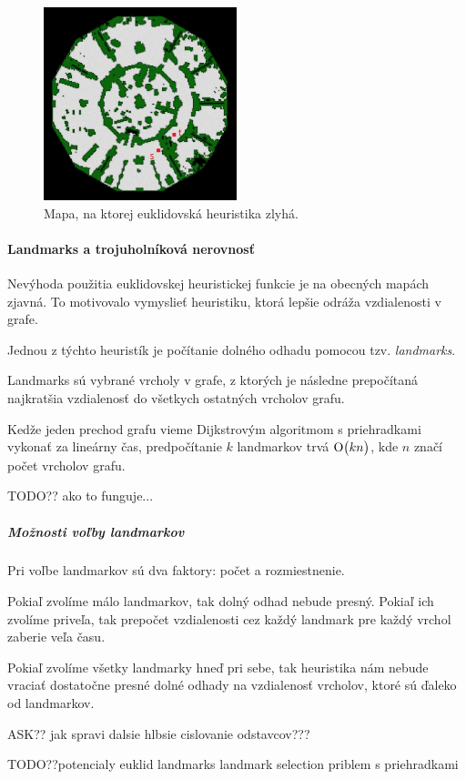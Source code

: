 \begin{figure}[h]
\centering
\includegraphics[width=0.5\textwidth]{./img/antieuclid505d.jpg}
\caption{Mapa, na ktorej euklidovská heuristika zlyhá.}
\label{fig:antieuclid}
\end{figure}


\paragraph{Landmarks a trojuholníková nerovnosť}
Nevýhoda použitia euklidovskej heuristickej funkcie je na obecných mapách zjavná. To motivovalo vymyslieť heuristiku, ktorá lepšie odráža vzdialenosti v grafe.

Jednou z týchto heuristík je počítanie dolného odhadu pomocou tzv. {\sl landmarks}. 

Landmarks sú vybrané vrcholy v grafe, z ktorých je následne prepočítaná najkratšia vzdialenosť do všetkych ostatných
vrcholov grafu. 



Kedže jeden prechod grafu vieme Dijkstrovým algoritmom s priehradkami vykonať za lineárny čas, predpočítanie $ k $ landmarkov trvá $ \operatorname{O}\bigl(kn\bigr) $, kde $n$ značí počet vrcholov grafu.


TODO?? ako to funguje...

\subparagraph{Možnosti voľby landmarkov}

Pri voľbe landmarkov sú dva faktory: počet a rozmiestnenie.

\begin{example}
Pokiaľ zvolíme málo landmarkov, tak dolný odhad nebude presný.
Pokiaľ ich zvolíme priveľa, tak prepočet vzdialenosti cez každý landmark pre každý vrchol zaberie veľa času.
\end{example}

\begin{example}
Pokiaľ zvolíme všetky landmarky hneď pri sebe, tak heuristika
nám nebude vraciať dostatočne presné dolné odhady na vzdialenosť vrcholov, ktoré sú ďaleko od landmarkov.
\end{example}


ASK?? jak spravi dalsie hlbsie cislovanie odstavcov???







TODO??potencialy euklid landmarks landmark selection priblem s priehradkami
